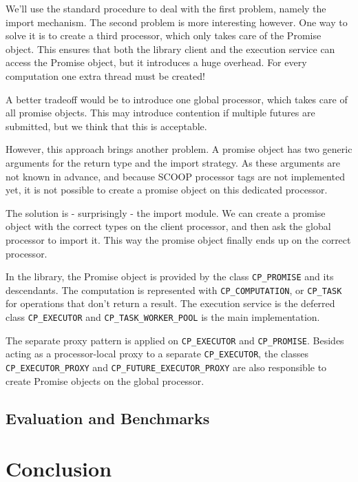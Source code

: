 \documentclass[a4paper,10pt]{report}
\begin{document}
We'll use the standard procedure to deal with the first problem, namely the import mechanism.
The second problem is more interesting however.
One way to solve it is to create a third processor, which only takes care of the Promise object.
This ensures that both the library client and the execution service can access the Promise object, but it introduces a huge overhead.
For every computation one extra thread must be created!

A better tradeoff would be to introduce one global processor, which takes care of all promise objects.
This may introduce contention if multiple futures are submitted, but we think that this is acceptable.

However, this approach brings another problem.
A promise object has two generic arguments for the return type and the import strategy.
As these arguments are not known in advance, and because SCOOP processor tags  are not implemented yet, it is not possible to create a promise object on this dedicated processor.

The solution is - surprisingly - the import module.
We can create a promise object with the correct types on the client processor, and then ask the global processor to import it.
This way the promise object finally ends up on the correct processor.

In the library, the Promise object is provided by the class \lstinline!CP_PROMISE! and its descendants.
The computation is represented with \lstinline!CP_COMPUTATION!, or \lstinline!CP_TASK! for operations that don't return a result.
The execution service is the deferred class \lstinline!CP_EXECUTOR! and \lstinline!CP_TASK_WORKER_POOL! is the main implementation.

The separate proxy pattern is applied on \lstinline!CP_EXECUTOR! and \lstinline!CP_PROMISE!.
Besides acting as a processor-local proxy to a separate \lstinline!CP_EXECUTOR!, 
the classes \lstinline!CP_EXECUTOR_PROXY! and \lstinline!CP_FUTURE_EXECUTOR_PROXY! are also responsible to create Promise objects on the global processor.

\subsection{Evaluation and Benchmarks}



\section{Conclusion}

\todos
\end{document}

